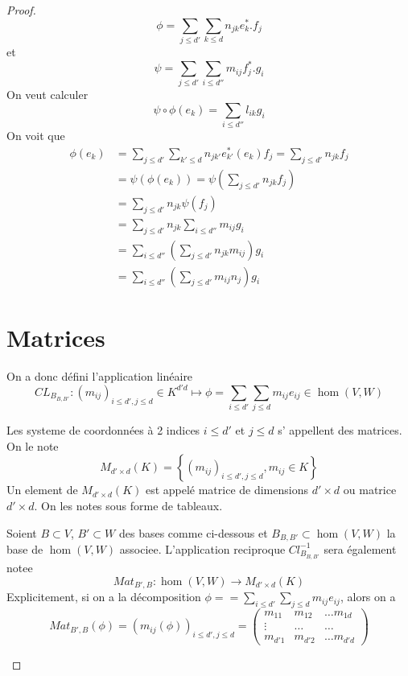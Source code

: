 \documentclass[../main.tex]{subfiles}
\begin{document}
\begin{proof}
\[ 
\phi = \sum_{j\leq d'}\sum_{ k \leq d}n_{jk} e_{k} ^{*} . f_j
\]
et 
\[ 
\psi = \sum_{j\leq d'} \sum_{i\leq d''} m_{ij} f_j^{*}. g_i
\]
On veut calculer
\[ 
	\psi\circ \phi( e_k) = \sum_{i\leq d''}  l_{ik} g_i
\]
On voit que 
\begin{align*}
	\phi( e_k) &= \sum_{j\leq d'} \sum_{k'\leq d} n_{jk'} e^{*}_{k'} ( e_k) f_j = \sum_{j\leq d'} n_{jk} f_j\\
&=\psi( \phi( e_k) ) = \psi(  \sum_{j\leq d'} n_{jk} f_j) \\
&= \sum_{j\leq d'}n_{jk} \psi( f_j) \\
&= \sum_{j\leq d'} n_{jk } \sum_{i\leq d''} m_{ij} g_i\\
&= \sum_{i\leq d''} \left( \sum_{j\leq d'}n_{jk} m_{ij} \right) g_i\\
&= \sum_{i\leq d''} \left( \sum_{j\leq d'}m_{ij} n_{j}  \right) g_i
\end{align*}
\section{Matrices}
On a donc défini l'application linéaire
\[ 
	CL_{B_{B,B'} } : ( m_{ij} ) _{i\leq d', j \leq d} \in K^{d' d}\mapsto \phi = \sum_{i\leq d'} \sum_{j\leq d} m_{ij} e_{ij} \in \hom ( V,W) 
\]
\begin{defn}
Les systeme de coordonnées à 2 indices $i\leq d'$ et $j \leq d$ s' appellent des matrices.\\
On le note
\[ 
	M_{d'\times d} ( K) = \left\{ ( m_{ij} ) _{i\leq d', j \leq d} , m_{ij} \in K \right\} 
\]
Un element de $M_{d'\times d} ( K) $ est appelé matrice de dimensions $d'\times d$ ou matrice $d'\times d$. On les notes sous forme de tableaux.
\end{defn}
\begin{defn}
	Soient $B \subset V$, $B' \subset W$ des bases comme ci-dessous et $B_{B,B'} \subset \hom( V,W) $ la base de $\hom( V,W) $ associee. L'application reciproque $Cl_{B_{B,B'} } ^{-1}$ sera également notee
	\[ 
		Mat_{B',B} : \hom( V,W) \to M_{d'\times d}( K) 
	\]
	Explicitement, si on a la décomposition $\phi == \sum_{i\leq d'} \sum_{j \leq d} m_{ij} e_{ij} $, alors on a
	\[ 
		Mat_{B',B} ( \phi)  = ( m_{ij } ( \phi) ) _{i\leq d', j \leq d} =
		\begin{pmatrix}
			m_{11} & m_{12} &\ldots m_{1d} \\
			\vdots & \ldots & \ldots\\
			m_{d'1} & m_{d'2} &\ldots m_{d'd} 
		\end{pmatrix}
	\]
	

\end{defn}
\end{proof}
\end{document}
